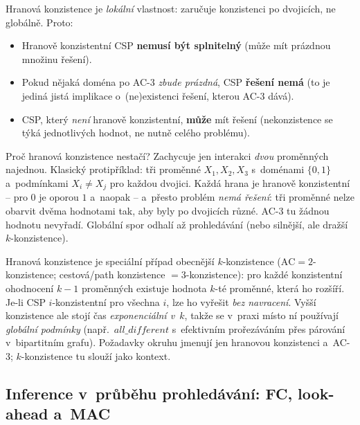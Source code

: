 \begin{veta}
Hranová konzistence je \emph{lokální} vlastnost: zaručuje konzistenci po dvojicích, ne globálně. Proto:
\begin{itemize}
  \item Hranově konzistentní CSP \textbf{nemusí být splnitelný} (může mít prázdnou množinu řešení).
  \item Pokud nějaká doména po AC-3 \emph{zbude prázdná}, CSP \textbf{řešení nemá} (to je jediná jistá implikace o~(ne)existenci řešení, kterou AC-3 dává).
  \item CSP, který \emph{není} hranově konzistentní, \textbf{může} mít řešení (nekonzistence se týká jednotlivých hodnot, ne nutně celého problému).
\end{itemize}
\end{veta}

\begin{intuice}
Proč hranová konzistence nestačí? Zachycuje jen interakci \emph{dvou} proměnných najednou. Klasický protipříklad: tři proměnné $X_1,X_2,X_3$ s~doménami $\{0,1\}$ a~podmínkami $X_i\neq X_j$ pro každou dvojici. Každá hrana je hranově konzistentní -- pro $0$ je oporou $1$ a~naopak -- a~přesto problém \emph{nemá řešení}: tři proměnné nelze obarvit dvěma hodnotami tak, aby byly po dvojicích různé. AC-3 tu žádnou hodnotu nevyřadí. Globální spor odhalí až prohledávání (nebo silnější, ale dražší $k$-konzistence).
\end{intuice}

\begin{poznamka}
Hranová konzistence je speciální případ obecnější $k$-konzistence ($\mathrm{AC} = 2$-konzistence; cestová/path konzistence $= 3$-konzistence): pro každé konzistentní ohodnocení $k-1$ proměnných existuje hodnota $k$-té proměnné, která ho rozšíří. Je-li CSP $i$-konzistentní pro všechna $i$, lze ho vyřešit \emph{bez navracení}. Vyšší konzistence ale stojí čas \emph{exponenciální v~$k$}, takže se v~praxi místo ní používají \emph{globální podmínky} (např.\ $\mathit{all\_different}$ s~efektivním prořezáváním přes párování v~bipartitním grafu). Požadavky okruhu jmenují jen hranovou konzistenci a~AC-3; $k$-konzistence tu slouží jako kontext.
\end{poznamka}

\subsection{Inference v~průběhu prohledávání: FC, look-ahead a~MAC}

